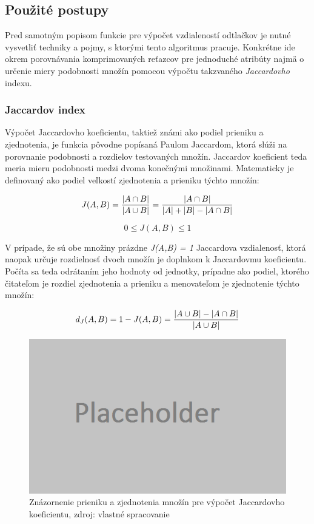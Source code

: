\documentclass[
  printed, %
  table,   %
  lof,     %
  lot,     %
]{fithesis3}
\begin{document}
\subsection{Použité postupy}
Pred samotným popisom funkcie pre výpočet vzdialeností odtlačkov je nutné
vysvetliť techniky a pojmy, s ktorými tento algoritmus pracuje. Konkrétne ide
okrem porovnávania komprimovaných reťazcov pre jednoduché atribúty najmä o 
určenie miery podobnosti množín pomocou výpočtu takzvaného
\textit{Jaccardovho} indexu.

\subsubsection{Jaccardov index}
Výpočet Jaccardovho koeficientu, taktiež známi ako podiel prieniku a 
zjednotenia, je funkcia pôvodne popísaná Paulom Jaccardom, ktorá slúži na
porovnanie podobnosti a rozdielov testovaných množín. Jaccardov koeficient teda
meria mieru podobnosti medzi dvoma konečnými množinami. Matematicky je
definovaný ako podiel veľkostí zjednotenia a prieniku týchto množín:

\begin{equation}
 J(A,B) = {{|A \cap B|}\over{|A \cup B|}} = {{|A \cap B|}\over{|A| + |B| - |A \cap B|}}
\end{equation}

\begin{equation}
 0\le J(A,B)\le 1
\end{equation}

V prípade, že sú obe množiny prázdne \textit{J(A,B) = 1}
Jaccardova vzdialenosť, ktorá naopak určuje rozdielnosť dvoch množín je
doplnkom k Jaccardovmu koeficientu. Počíta sa teda odrátaním jeho hodnoty od
jednotky, prípadne ako podiel, ktorého čitateľom je rozdiel zjednotenia a
prieniku a menovateľom je zjednotenie týchto množín:

\begin{equation}
 d_J(A,B) = 1 - J(A,B) = { { |A \cup B| - |A \cap B| } \over |A \cup B| }
\end{equation}

\begin{figure}[h]
  \centering
    \includegraphics[width=.99\textwidth]{images/footprint-jacc-sets.png}
  \caption{Znázornenie prieniku a zjednotenia množín pre výpočet Jaccardovho
  koeficientu, zdroj: vlastné spracovanie}
  \label{fig:footprint-jacc-sets}
\end{figure}
\end{document}
